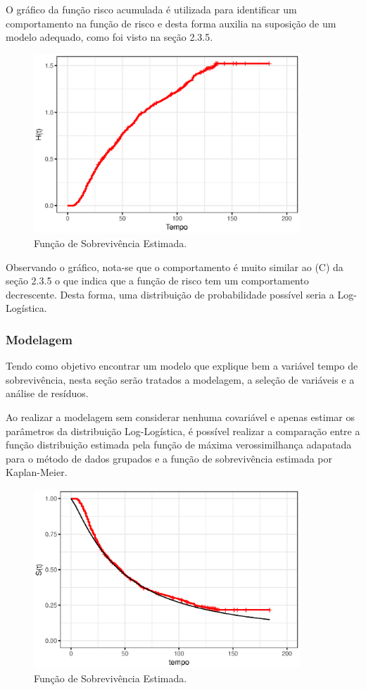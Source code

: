 \documentclass[a4paper,12pt]{article}
\begin{document}
O gráfico da função risco acumulada é utilizada para identificar um comportamento na função de risco e desta forma auxilia na suposição de um modelo adequado, como foi visto na seção 2.3.5.

\begin{figure}[H] \label{fig:surv_vit}
  \begin{center}
    \includegraphics[width=10cm]{cum_haz_vit}
    \caption{Função de Sobrevivência Estimada.}
  \end{center}
\end{figure}

Observando o gráfico, nota-se que o comportamento é muito similar ao (C) da seção 2.3.5 o que indica que a função de risco tem um comportamento decrescente. Desta forma, uma distribuição de probabilidade possível seria a Log-Logística.

\subsubsection{Modelagem}

Tendo como objetivo encontrar um modelo que explique bem a variável tempo de sobrevivência, nesta seção serão tratados a modelagem, a seleção de variáveis e a análise de resíduos.

Ao realizar a modelagem sem considerar nenhuma covariável e apenas estimar os parâmetros da distribuição Log-Logística, é possível realizar a comparação entre a função distribuição estimada pela função de máxima verossimilhança adapatada para o método de dados grupados e a função de sobrevivência estimada por Kaplan-Meier.

\begin{figure}[H] \label{fig:surv_vit}
  \begin{center}
    \includegraphics[width=10cm]{mod_vazio_vit}
    \caption{Função de Sobrevivência Estimada.}
  \end{center}
\end{figure}
\end{document}
